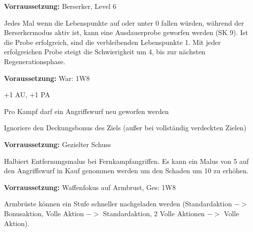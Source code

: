 \documentclass[../../Heldenanleitung2]{subfiles}
\begin{document}
\begin{multicols}{2}
\begin{tcolorbox}[title={Berserkerkraft, Unbezwingbar},colbacktitle=red, coltitle=black]    
    \textbf{Vorraussetzung:} Berserker, Level 6
	\vspace{0.2cm}	
	
    Jedes Mal wenn die Lebenspunkte auf oder unter 0 fallen würden, während der Berserkermodus aktiv ist, kann eine Ausdauerprobe geworfen werden (SK 9). Ist die Probe erfolgreich, sind die verbleibenden Lebenspunkte 1. Mit jeder erfolgreichen Probe steigt die Schwierigkeit um 4, bis zur nächsten Regenerationsphase.
\end{tcolorbox}

\begin{tcolorbox}[title={Schnelle Reflexe},colbacktitle=red, coltitle=black]
	\textbf{Voraussetzung:} War: 1W8
	\vspace{0.2cm}
	
   +1 AU, +1 PA
\end{tcolorbox}

\begin{tcolorbox}[title={Kampferfahrung},colbacktitle=red, coltitle=black]    
   Pro Kampf darf ein Angriffswurf neu geworfen werden
\end{tcolorbox}

\begin{tcolorbox}[title={Gezielter Schuss},colbacktitle=red, coltitle=black]    
   Ignoriere den Deckungsbonus des Ziels (außer bei vollständig verdeckten Zielen)
\end{tcolorbox}

\begin{tcolorbox}[title={Scharfschütze},colbacktitle=red, coltitle=black]
	\textbf{Vorraussetzung:} Gezielter Schuss
	\vspace{0.2cm}
	
   Halbiert Entfernungsmalus bei Fernkampfangriffen. Es kann ein Malus von 5 auf den Angriffswurf in Kauf genommen werden um den Schaden um 10 zu erhöhen.
\end{tcolorbox}

\begin{tcolorbox}[title={Armbrustexperte},colbacktitle=red, coltitle=black]
\textbf{Vorraussetzung:} Waffenfokus auf Armbrust, Ges: 1W8
\vspace{0.2cm}

Armbrüste können ein Stufe schneller nachgeladen werden (Standardaktion $->$ Bonusaktion, Volle Aktion $->$ Standardaktion, 2 Volle Aktionen $->$ Volle Aktion).
\end{tcolorbox}


\end{multicols}
\end{document}
